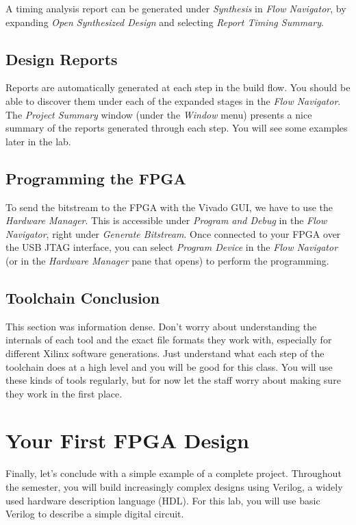 \documentclass[11pt]{article}
\begin{document}
A timing analysis report can be generated under \emph{Synthesis} in \emph{Flow Navigator}, by expanding \emph{Open Synthesized Design} and selecting \emph{Report Timing Summary}.

\subsection{Design Reports}

Reports are automatically generated at each step in the build flow. You should be able to discover them under each of the expanded stages in the \emph{Flow Navigator}. The \emph{Project Summary} window (under the \emph{Window} menu) presents a nice summary of the reports generated through each step. You will see some examples later in the lab.

\subsection{Programming the FPGA}

To send the bitstream to the FPGA with the Vivado GUI, we have to use the \emph{Hardware Manager}. This is accessible under \emph{Program and Debug} in the \emph{Flow Navigator}, right under \emph{Generate Bitstream}. Once connected to your FPGA over the USB JTAG interface, you can select \emph{Program Device} in the \emph{Flow Navigator} (or in the \emph{Hardware Manager} pane that opens) to perform the programming.

\subsection{Toolchain Conclusion}
This section was information dense. Don't worry about understanding the internals of each tool and the exact file formats they work with, especially for different Xilinx software generations. Just understand what each step of the toolchain does at a high level and you will be good for this class. You will use these kinds of tools regularly, but for now let the staff worry about making sure they work in the first place.

\section{Your First FPGA Design}
Finally, let's conclude with a simple example of a complete project. Throughout the semester, you will build increasingly complex designs using Verilog, a widely used hardware description language (HDL). For this lab, you will use basic Verilog to describe a simple digital circuit.
\end{document}
